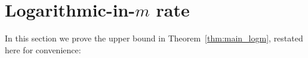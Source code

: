 \documentclass[10pt]{article}
\renewcommand{\epsilon}{\varepsilon}
\DeclareMathOperator{\Tr}{Tr}
\newcommand{\sitan}[1]{{\color{red}[sitan: #1]}}
\renewcommand{\sitan}[1]{}
\newcommand{\lift}[1]{\overline{#1}}
\begin{document}

\section{Logarithmic-in-\texorpdfstring{$m$}{m} rate}
\label{sec:logm}

In this section we prove the upper bound in Theorem~\ref{thm:main_logm}, restated here for convenience:

\logm*


\end{document}
